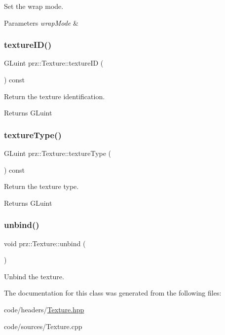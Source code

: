 Set the wrap mode. 


\begin{DoxyParams}{Parameters}
{\em wrap\+Mode} & \\
\hline
\end{DoxyParams}
\mbox{\label{classprz_1_1_texture_a5d49295c73908a7e2962ec71f8f72bcb}} 
\subsubsection{\texorpdfstring{textureID()}{textureID()}}
{\footnotesize\ttfamily G\+Luint prz\+::\+Texture\+::texture\+ID (\begin{DoxyParamCaption}{ }\end{DoxyParamCaption}) const\hspace{0.3cm}{\ttfamily [inline]}}



Return the texture identification. 

\begin{DoxyReturn}{Returns}
G\+Luint 
\end{DoxyReturn}
\mbox{\label{classprz_1_1_texture_a3cdf458e7d2adefec6da4cde932cf775}} 
\subsubsection{\texorpdfstring{textureType()}{textureType()}}
{\footnotesize\ttfamily G\+Luint prz\+::\+Texture\+::texture\+Type (\begin{DoxyParamCaption}{ }\end{DoxyParamCaption}) const\hspace{0.3cm}{\ttfamily [inline]}}



Return the texture type. 

\begin{DoxyReturn}{Returns}
G\+Luint 
\end{DoxyReturn}
\mbox{\label{classprz_1_1_texture_a55ae7e8c1e609b7d0e911c69e3614840}} 
\subsubsection{\texorpdfstring{unbind()}{unbind()}}
{\footnotesize\ttfamily void prz\+::\+Texture\+::unbind (\begin{DoxyParamCaption}{ }\end{DoxyParamCaption})\hspace{0.3cm}{\ttfamily [inline]}}



Unbind the texture. 



The documentation for this class was generated from the following files\+:\begin{DoxyCompactItemize}
\item 
code/headers/\mbox{\hyperlink{_texture_8hpp}{Texture.\+hpp}}\item 
code/sources/Texture.\+cpp\end{DoxyCompactItemize}
